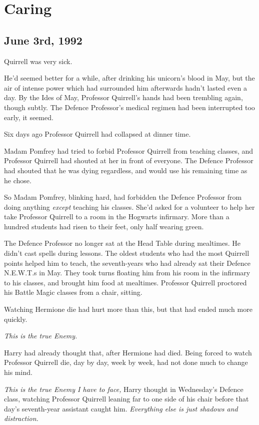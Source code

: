 \chapter{Caring}

\section{June 3rd, 1992}

 Quirrell was very sick.

\hplettrineextrapara
He’d seemed better for a while, after drinking his unicorn’s blood in May, but the air of intense power which had surrounded him afterwards hadn’t lasted even a day. By the Ides of May, Professor Quirrell’s hands had been trembling again, though subtly. The Defence Professor’s medical regimen had been interrupted too early, it seemed.

Six days ago Professor Quirrell had collapsed at dinner time.

Madam Pomfrey had tried to forbid Professor Quirrell from teaching classes, and Professor Quirrell had shouted at her in front of everyone. The Defence Professor had shouted that he was dying regardless, and would use his remaining time as he chose.

So Madam Pomfrey, blinking hard, had forbidden the Defence Professor from doing anything \emph{except} teaching his classes. She’d asked for a volunteer to help her take Professor Quirrell to a room in the Hogwarts infirmary. More than a hundred students had risen to their feet, only half wearing green.

The Defence Professor no longer sat at the Head Table during mealtimes. He didn’t cast spells during lessons. The oldest students who had the most Quirrell points helped him to teach, the seventh-years who had already sat their Defence N.E.W.T.s in May. They took turns floating him from his room in the infirmary to his classes, and brought him food at mealtimes. Professor Quirrell proctored his Battle Magic classes from a chair, sitting.

Watching Hermione die had hurt more than this, but that had ended much more quickly.

\emph{This is the true Enemy.}

Harry had already thought that, after Hermione had died. Being forced to watch Professor Quirrell die, day by day, week by week, had not done much to change his mind.

\emph{This is the true Enemy I have to face,} Harry thought in Wednesday’s Defence class, watching Professor Quirrell leaning far to one side of his chair before that day’s seventh-year assistant caught him. \emph{Everything else is just shadows and distraction.}

